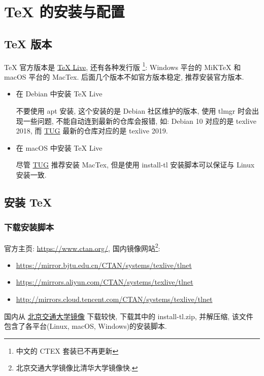 \chapter{{\TeX} 的安装与配置}

\section{{\TeX} 版本}

{\TeX} 官方版本是 \href{http://www.tug.org/texlive}{{\TeX} Live}, 还有各种发行版
\footnote{中文的 CTEX 套装已不再更新}: Windows 平台的 MiKTeX 和 macOS 平台的 MacTex. 
后面几个版本不如官方版本稳定, 推荐安装官方版本.

\begin{itemize}
    \item{在 Debian 中安装 {\TeX} Live}

    不要使用 apt 安装, 这个安装的是 Debian 社区维护的版本, 使用 tlmgr 时会出现一些问题, 
    不能自动连到最新的仓库会报错, 如: Debian 10 对应的是 texlive 2018, 
    而 \href{https://tug.org/}{TUG} 最新的仓库对应的是 texlive 2019.

    \item{在 macOS 中安装 {\TeX} Live}

    尽管 \href{https://tug.org/}{TUG} 推荐安装 MacTex, 但是使用 install-tl 安装脚本可以保证与 Linux 安装一致. 
\end{itemize}

\section{安装 {\TeX}}

\subsection{下载安装脚本}

官方主页: \url{https://www.ctan.org/}, 国内镜像网站\footnote{北京交通大学镜像比清华大学镜像快.}:

\begin{itemize}
    \item \url{https://mirror.bjtu.edu.cn/CTAN/systems/texlive/tlnet}
    \item \url{https://mirrors.aliyun.com/CTAN/systems/texlive/tlnet}
    \item \url{http://mirrors.cloud.tencent.com/CTAN/systems/texlive/tlnet}
\end{itemize}

国内从 \href{https://mirror.bjtu.edu.cn/CTAN/systems/texlive/tlnet}{北京交通大学镜像} 下载较快, 
下载其中的 install-tl.zip, 并解压缩, 该文件包含了各平台(Linux, macOS, Windows)的安装脚本.


